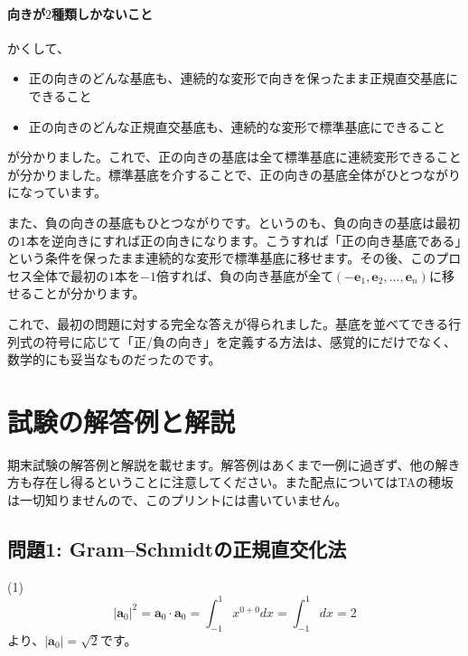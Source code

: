 \paragraph{向きが$2$種類しかないこと}

かくして、
\begin{itemize}
\item 正の向きのどんな基底も、連続的な変形で向きを保ったまま正規直交基底にできること
\item 正の向きのどんな正規直交基底も、連続的な変形で標準基底にできること
\end{itemize}
が分かりました。これで、正の向きの基底は全て標準基底に連続変形できることが分かりました。標準基底を介することで、正の向きの基底全体がひとつながりになっています。

また、負の向きの基底もひとつながりです。というのも、負の向きの基底は最初の$1$本を逆向きにすれば正の向きになります。こうすれば「正の向き基底である」という条件を保ったまま連続的な変形で標準基底に移せます。その後、このプロセス全体で最初の$1$本を$-1$倍すれば、負の向き基底が全て$(-\bm{e}_1, \bm{e}_2, \ldots, \bm{e}_n)$に移せることが分かります。

これで、最初の問題に対する完全な答えが得られました。基底を並べてできる行列式の符号に応じて「正/負の向き」を定義する方法は、感覚的にだけでなく、数学的にも妥当なものだったのです。

\section{試験の解答例と解説}

期末試験の解答例と解説を載せます。解答例はあくまで一例に過ぎず、他の解き方も存在し得るということに注意してください。また配点についてはTAの穂坂は一切知りませんので、このプリントには書いていません。

\subsection{問題1: Gram--Schmidtの正規直交化法}

\noindent (1)
\[
|\bm{a}_0|^2 = \bm{a}_0 \cdot \bm{a}_0 = \int_{-1}^1 x^{0 + 0} dx = \int_{-1}^1 dx = 2
\]
より、$|\bm{a}_0| = \sqrt{2}$です。

